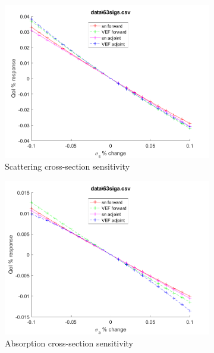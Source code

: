 \documentclass{article}
\begin{document}
\begin{figure}[H]
\begin{subfigure}{.5\textwidth}
  \includegraphics[width=.98\linewidth]{IanProposal/figures2/63sigsSens.png}
  \caption{Scattering cross-section sensitivity}
  \label{fig:sfig2}
\end{subfigure}%
\begin{subfigure}{.5\textwidth}
  \centering
  \includegraphics[width=.98\linewidth]{IanProposal/figures2/63sigaSens.png}
  \caption{Absorption cross-section sensitivity}
  \label{fig:sfig5}
\end{subfigure}%
\caption{}
\label{fig:fig}
\end{figure}
\newpage

\end{document}
